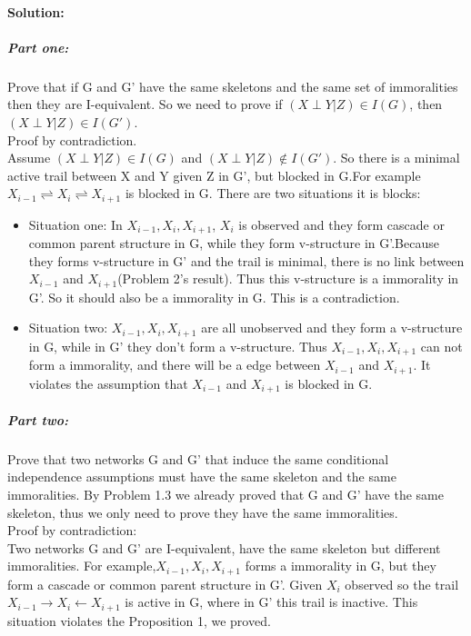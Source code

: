\documentclass[twoside]{article}
\begin{document}
\begin{itemize}
\paragraph{Solution:} 
\subparagraph{Part one:}Prove that if G and G' have the same skeletons and the same set of immoralities then they are I-equivalent. So we need to prove if $(X\perp Y|Z)\in I(G)$, then $(X\perp Y|Z)\in I(G')$.\\
Proof by contradiction.\\
Assume  $(X\perp Y|Z)\in I(G)$ and $(X\perp Y|Z)\not\in I(G')$. So there is a minimal active trail between X and Y given Z in G', but blocked in G.For example $X_{i-1} \rightleftharpoons X_{i} \rightleftharpoons X_{i+1}$ is blocked in G. There are two situations it is blocks:
\begin{itemize}
\item[]Situation one: In $X_{i-1}, X_{i},X_{i+1}$, $X_i$ is observed and they form cascade or common parent structure in G, while they form v-structure in G'.Because they forms v-structure in G' and the trail is minimal, there is no link between $X_{i-1}$ and $X_{i+1}$(Problem 2's result). Thus this v-structure is a immorality in G'. So it should also be a immorality in G. This is a contradiction.
\item[]Situation two: $X_{i-1}, X_{i},X_{i+1}$ are all unobserved and they form a v-structure in G, while in G' they don't form a v-structure. Thus $X_{i-1}, X_{i},X_{i+1}$ can not form a immorality, and there will be a edge between $X_{i-1}$ and $X_{i+1}$. It violates the assumption that $X_{i-1}$ and $X_{i+1}$ is blocked in G.
\end{itemize} 

\subparagraph{Part two:}Prove that two networks G and G' that induce the same conditional independence assumptions must have the same skeleton and the same immoralities. By Problem 1.3 we already proved that G and G' have the same skeleton, thus we only need to prove they have the same immoralities.\\
Proof by contradiction:\\
Two networks G and G' are I-equivalent, have the same skeleton but different immoralities. For example,$X_{i-1},X_i,X_{i+1}$ forms a immorality in G, but they form a cascade or common parent structure in G'. Given $X_i$ observed so the trail $X_{i-1}\rightarrow X_i \leftarrow X_{i+1}$ is active in G, where in G' this trail is inactive. This situation violates the Proposition 1, we proved.
\end{itemize}
\end{document}
